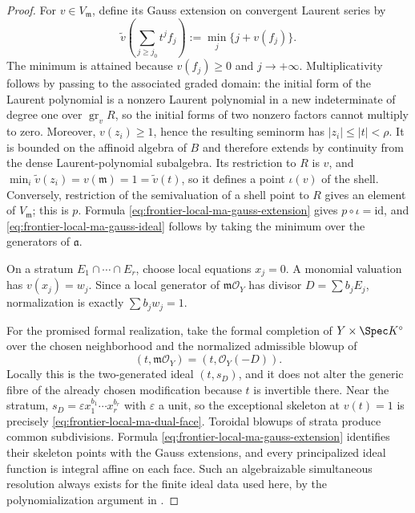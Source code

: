 \begin{proof}
For \(v\in V_{\mathfrak m}\), define its Gauss extension on convergent
Laurent series by
\begin{equation}
 \widetilde v\!\left(\sum_{j\geq j_0}t^jf_j\right)
       :=\min_j\{j+v(f_j)\}.
 \label{eq:frontier-local-ma-gauss-extension}
\end{equation}
The minimum is attained because \(v(f_j)\geq0\) and \(j\to+\infty\).
Multiplicativity follows by passing to the associated graded domain:
the initial form of the Laurent polynomial is a nonzero Laurent polynomial
in a new indeterminate of degree one over \(\operatorname{gr}_vR\), so the
initial forms of two nonzero factors cannot multiply to zero.  Moreover,
\(v(z_i)\geq1\), hence the resulting seminorm has
\(|z_i|\leq|t|<\rho\).  It is bounded on the affinoid algebra of \(B\) and
therefore extends by continuity from the dense Laurent-polynomial
subalgebra.
Its restriction to \(R\) is \(v\), and
\(\min_i\widetilde v(z_i)=v(\mathfrak m)=1=\widetilde v(t)\), so it defines
a point \(\iota(v)\) of the shell.  Conversely, restriction of the
semivaluation of a shell point to \(R\) gives an element of
\(V_{\mathfrak m}\); this is \(p\).  Formula
\eqref{eq:frontier-local-ma-gauss-extension} gives
\(p\circ\iota=\mathrm{id}\), and
\eqref{eq:frontier-local-ma-gauss-ideal} follows by taking the minimum over
the generators of \(\mathfrak a\).

On a stratum \(E_1\cap\cdots\cap E_r\), choose local equations
\(x_j=0\).  A monomial valuation has \(v(x_j)=w_j\).  Since a local
generator of \(\mathfrak m\mathcal O_Y\) has divisor
\(D=\sum b_jE_j\), normalization is exactly
\(\sum b_jw_j=1\).

For the promised formal realization, take the formal completion of
\(Y\times\Spec K^\circ\) over the chosen neighborhood and the normalized
admissible blowup of
\[
              (t,\mathfrak m\mathcal O_Y)
              =(t,\mathcal O_Y(-D)).
\]
Locally this is the two-generated ideal \((t,s_D)\), and it does not alter
the generic fibre of the already chosen modification because \(t\) is
invertible there.  Near the stratum,
\(s_D=\varepsilon x_1^{b_1}\cdots x_r^{b_r}\) with \(\varepsilon\) a unit,
so the exceptional skeleton at \(v(t)=1\) is precisely
\eqref{eq:frontier-local-ma-dual-face}.  Toroidal blowups of strata produce
common subdivisions.  Formula \eqref{eq:frontier-local-ma-gauss-extension}
identifies their skeleton points with the Gauss extensions, and every
principalized ideal function is integral affine on each face.
Such an algebraizable simultaneous resolution always exists for the finite
ideal data used here, by the polynomialization argument in
.
\end{proof}

